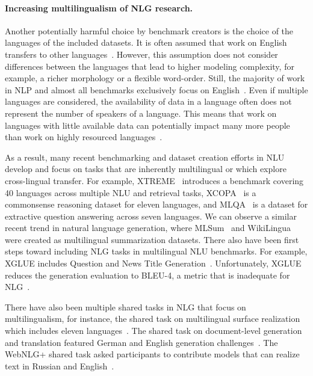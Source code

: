 \documentclass[11pt,a4paper]{article}
\begin{document}
\paragraph{Increasing multilingualism of NLG research.}

Another potentially harmful choice by benchmark creators is the choice of the languages of the included datasets. It is often assumed that work on English transfers to other languages~\citep{Bender2011OnAA}. However, this assumption does not consider differences between the languages that lead to higher modeling complexity, for example, a richer morphology or a flexible word-order. Still, the majority of work in NLP and almost all benchmarks exclusively focus on English~\citep[e.g.,][]{wang2018glue,liu2020glge,mccann2018natural}. Even if multiple languages are considered, the availability of data in a language often does not represent the number of speakers of a language. This means that work on languages with little available data can potentially impact many more people than work on highly resourced languages~\citep{joshi2020state}.

As a result, many recent benchmarking and dataset creation efforts in NLU develop and focus on tasks that are inherently multilingual or which explore cross-lingual transfer. 
For example, XTREME~\citep{hu2020xtreme} introduces a benchmark covering 40 languages across multiple NLU and retrieval tasks, XCOPA~\citep{ponti2020xcopa} is a commonsense reasoning dataset for eleven languages, and MLQA~\citep{lewis2020mlqa} is a dataset for extractive question answering across seven languages. 
We can observe a similar recent trend in natural language generation, where MLSum~\citep{scialom2020mlsum} and WikiLingua~\citep{ladhak2020wikilingua} were created as multilingual summarization datasets. 
There also have been first steps toward including NLG tasks in multilingual NLU benchmarks. For example, XGLUE includes Question and News Title Generation~\citep{liang2020xglue}. Unfortunately, XGLUE reduces the generation evaluation to BLEU-4, a metric that is inadequate for NLG~\citep{reiter2018structured}.

There have also been multiple shared tasks in NLG that focus on multilingualism, for instance, the shared task on multilingual surface realization which includes eleven languages~\citep{mille2018first,mille2019proceedings,mille2020third}. The shared task on document-level generation and translation featured German and English generation challenges~\citep{heafield2020findings}. The WebNLG+ shared task asked participants to contribute models that can realize text in Russian and English~\citep{ferreira20202020}.
\end{document}
